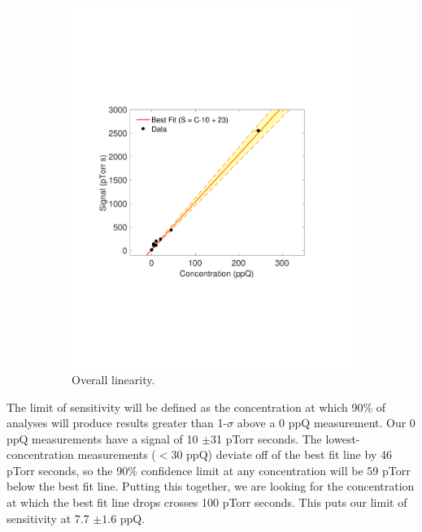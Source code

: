 \documentclass[12pt]{article}
\begin{document}
\begin{figure}[h!]
\begin{subfigure}{0.5\textwidth}
  \centering
  \includegraphics[width=\textwidth]{Figures/LinPlot0217.pdf}
  \caption{Overall linearity.}
\end{subfigure}
\caption{}
\label{fig:linplot2017}
\end{figure}

The limit of sensitivity will be defined as the concentration at which 90\% of analyses will produce results greater than 1-$\sigma$ above a 0 ppQ measurement. Our 0 ppQ measurements have a signal of 10 $\pm$31 pTorr seconds. The lowest-concentration measurements ($<30$ ppQ) deviate off of the best fit line by 46 pTorr seconds, so the 90\% confidence limit at any concentration will be 59 pTorr below the best fit line. Putting this together, we are looking for the concentration at which the best fit line drops crosses 100 pTorr seconds. This puts our limit of sensitivity at 7.7 $\pm 1.6$ ppQ.
\end{document}
